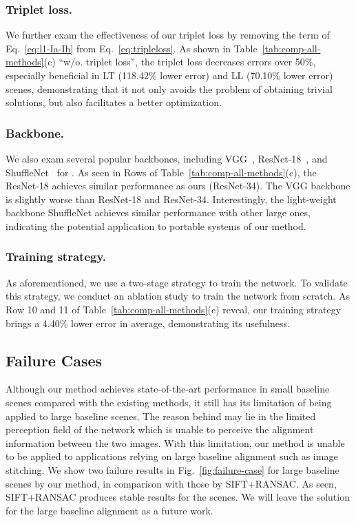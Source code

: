\documentclass[runningheads]{llncs}
\begin{document}
\subsubsection{Triplet loss.}
We further exam the effectiveness of our triplet loss by removing the term of Eq.~\ref{eq:l1-Ia-Ib} from Eq.~\ref{eq:tripleloss}. As shown in Table~\ref{tab:comp-all-methods}(c) ``w/o. triplet loss'', the triplet loss decreases errors over 50\%, especially beneficial in LT (118.42\% lower error) and LL (70.10\% lower error) scenes, demonstrating that it not only avoids the problem of obtaining trivial solutions, but also facilitates a better optimization.

\subsubsection{Backbone.}
We also exam several popular backbones, including VGG~\cite{simonyan2014very}, ResNet-18~\cite{he2016deep}, and ShuffleNet~\cite{zhang2018shufflenet} for . As seen in Rows  of Table~\ref{tab:comp-all-methods}(c), the ResNet-18 achieves similar performance as ours (ResNet-34). The VGG backbone is slightly worse than ResNet-18 and ResNet-34. Interestingly, the light-weight backbone ShuffleNet achieves similar performance with other large ones, indicating the potential  application to portable systems of our method. 



\subsubsection{Training strategy.}\label{subsec:ablation-training-strategy}
As aforementioned, we use a two-stage strategy to train the network. To validate this strategy, we conduct an ablation study to train the network from scratch. As Row 10 and 11 of Table~\ref{tab:comp-all-methods}(c) reveal, our training strategy brings a 4.40\% lower error in average, demonstrating its usefulness.








\subsection{Failure Cases}
Although our method achieves state-of-the-art performance in small baseline scenes compared with the existing methods, it still has its limitation of being applied to large baseline scenes. The reason behind may lie in the limited perception field of the network which is unable to perceive the alignment information between the two images. With this limitation, our method is unable to be applied to applications relying on large baseline alignment such as image stitching. We show two failure results in Fig.~\ref{fig:failure-case} for large baseline scenes by our method, in comparison with those by SIFT+RANSAC. As seen, SIFT+RANSAC produces stable results for the scenes. We will leave the solution for the large baseline alignment as a future work.
\end{document}
